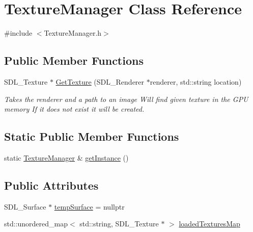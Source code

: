 \hypertarget{class_texture_manager}{}\section{Texture\+Manager Class Reference}
\label{class_texture_manager}


{\ttfamily \#include $<$Texture\+Manager.\+h$>$}

\subsection*{Public Member Functions}
\begin{DoxyCompactItemize}
\item 
S\+D\+L\+\_\+\+Texture $\ast$ \mbox{\hyperlink{class_texture_manager_ac472bb04e6b78569441d5088e5dafa33}{Get\+Texture}} (S\+D\+L\+\_\+\+Renderer $\ast$renderer, std\+::string location)
\begin{DoxyCompactList}\small\item\em Takes the renderer and a path to an image Will find given texture in the G\+PU memory If it does not exist it will be created. \end{DoxyCompactList}\end{DoxyCompactItemize}
\subsection*{Static Public Member Functions}
\begin{DoxyCompactItemize}
\item 
static \mbox{\hyperlink{class_texture_manager}{Texture\+Manager}} \& \mbox{\hyperlink{class_texture_manager_a0a6bc63e2f6fa7e1d0aee5b24cfa089a}{get\+Instance}} ()
\end{DoxyCompactItemize}
\subsection*{Public Attributes}
\begin{DoxyCompactItemize}
\item 
S\+D\+L\+\_\+\+Surface $\ast$ \mbox{\hyperlink{class_texture_manager_a29954bc68f26b374cd86849b8a35c9ff}{temp\+Surface}} = nullptr
\item 
std\+::unordered\+\_\+map$<$ std\+::string, S\+D\+L\+\_\+\+Texture $\ast$ $>$ \mbox{\hyperlink{class_texture_manager_a2c91da057fc96141f7527dc7d2185417}{loaded\+Textures\+Map}}
\end{DoxyCompactItemize}



